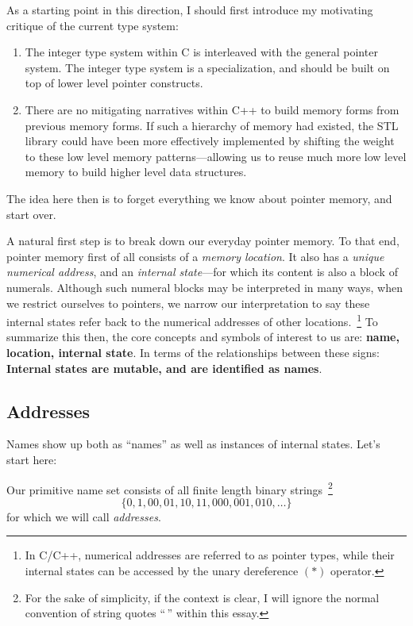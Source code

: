 \documentclass[twoside]{article}
\newenvironment{definition}[1][Definition]{\begin{trivlist}
\item[\hskip \labelsep {\bfseries #1:}]}{\end{trivlist}}
\begin{document}
As a starting point in this direction, I should first introduce my motivating critique of the current type system:
\begin{enumerate}
\item The integer type system within C is interleaved with the general pointer system. The integer type system is a specialization,
      and should be built on top of lower level pointer constructs.
\item There are no mitigating narratives within C++ to build memory forms from previous memory forms. If such a hierarchy of memory
      had existed, the STL library could have been more effectively implemented by shifting the weight to these low level memory
      patterns---allowing us to reuse much more low level memory to build higher level data structures.
\end{enumerate}

The idea here then is to forget everything we know about pointer memory, and start over.

A natural first step is to break down our everyday pointer memory. To that end, pointer memory first of all consists of
a \emph{memory location}. It also has a \emph{unique numerical address}, and an \emph{internal state}---for which its content
is also a block of numerals. Although such numeral blocks may be interpreted in many ways, when we restrict ourselves to pointers,
we narrow our interpretation to say these internal states refer back to the numerical addresses of other locations.~\footnote{In
C/C++, numerical addresses are referred to as pointer types, while their internal states can be accessed by the unary dereference
$ (*) $ operator.} To summarize this then, the core concepts and symbols of interest to us are: {\bf name, location, internal state}.
In terms of the relationships between these signs: {\bf Internal states are mutable, and are identified as names}.

\newpage

\subsection*{Addresses}

Names show up both as ``names'' as well as instances of internal states. Let's start here:
\begin{definition}[Address]
Our primitive name set consists of all finite length binary strings~\footnote{For the sake of simplicity,
if the context is clear, I will ignore the normal convention of string quotes ``\,'' within this essay.}
$$ \{0, 1, 00, 01, 10, 11, 000, 001, 010, \ldots \} $$
for which we will call \emph{addresses}.
\end{definition}
\end{document}
